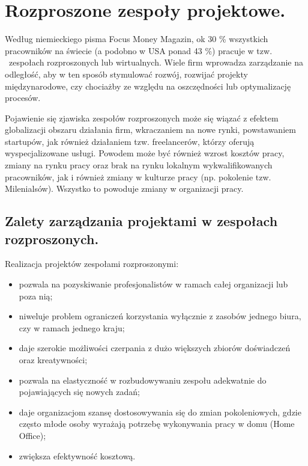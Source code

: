 
\chapter{Rozproszone zespoły projektowe.}

Według niemieckiego pisma Focus Money Magazin, ok 30 \% wszystkich pracowników na świecie (a podobno w USA ponad 43 \%) pracuje w tzw. \ zespołach rozproszonych lub wirtualnych.
 Wiele firm wprowadza zarządzanie na odległość, aby w ten sposób stymulować rozwój, rozwijać projekty międzynarodowe, czy chociażby ze względu na oszczędności lub optymalizację procesów.

Pojawienie się zjawiska zespołów rozproszonych może się wiązać z efektem globalizacji obszaru działania firm, wkraczaniem na nowe rynki,
powstawaniem startupów, jak również działaniem tzw. freelancerów, którzy oferują wyspecjalizowane usługi.
Powodem może być również wzrost kosztów pracy, zmiany na rynku pracy oraz brak na rynku lokalnym wykwalifikowanych pracowników,
 jak i również zmiany w kulturze pracy (np. pokolenie tzw. Milenialsów). Wszystko to powoduje zmiany w organizacji pracy.

\section{Zalety zarządzania projektami w zespołach rozproszonych.}

Realizacja projektów zespołami rozproszonymi:

\begin{itemize}
	\item pozwala na pozyskiwanie profesjonalistów w ramach całej organizacji lub poza nią;
	\item niweluje problem ograniczeń korzystania wyłącznie z zasobów jednego biura, czy w ramach jednego kraju;
	\item daje szerokie możliwości czerpania z dużo większych zbiorów doświadczeń oraz kreatywności;
	\item pozwala na elastyczność w rozbudowywaniu zespołu adekwatnie do pojawiających się nowych zadań;
	\item daje organizacjom szansę dostosowywania się do zmian pokoleniowych, gdzie często młode osoby wyrażają potrzebę wykonywania pracy w domu (Home Office);
	\item zwiększa efektywność kosztową.
\end{itemize}


